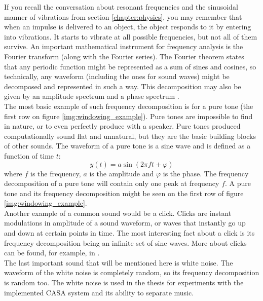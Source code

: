 If you recall the conversation about resonant frequencies and the sinusoidal manner of vibrations from section \ref{chapter:physics}, you may remember that when an impulse is delivered to an object, the object responds to it by entering into vibrations. It starts to vibrate at all possible frequencies, but not all of them survive. An important mathematical instrument for frequency analysis is the Fourier transform (along with the Fourier series). The Fourier theorem states that any periodic function might be represented as a sum of sines and cosines, so technically, any waveform (including the ones for sound waves) might be decomposed and represented in such a way. This decomposition may also be given by an amplitude spectrum and a phase spectrum \cite{Schnupp2011}.\\

The most basic example of such frequency decomposition is for a pure tone (the first row on figure \ref{img:windowing_example}). Pure tones are impossible to find in nature, or to even perfectly produce with a speaker. Pure tones produced computationally sound flat and unnatural, but they are the basic building blocks of other sounds. The waveform of a pure tone is a sine wave and is defined as a function of time $t$:
\begin{equation}
	y(t) = a\sin(2\pi{}ft + \varphi)
\end{equation}
where $f$ is the frequency, $a$ is the amplitude and $\varphi$ is the phase. The frequency decomposition of a pure tone will contain only one peak at frequency $f$. A pure tone and its frequency decomposition might be seen on the first row of figure \ref{img:windowing_example}.\\

Another example of a common sound would be a click. Clicks are instant modulations in amplitude of a sound waveform, or waves that instantly go up and down at certain points in time. The most interesting fact about a click is its frequency decomposition being an infinite set of sine waves. More about clicks can be found, for example, in \cite{Schnupp2011}.\\

The last important sound that will be mentioned here is white noise. The waveform of the white noise is completely random, so its frequency decomposition is random too. The white noise is used in the thesis for experiments with the implemented CASA system and its ability to separate music.\\

